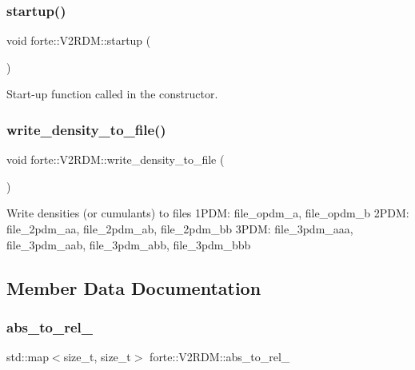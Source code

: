 \subsubsection{\texorpdfstring{startup()}{startup()}}
{\footnotesize\ttfamily void forte\+::\+V2\+R\+D\+M\+::startup (\begin{DoxyParamCaption}{ }\end{DoxyParamCaption})\hspace{0.3cm}{\ttfamily [protected]}}



Start-\/up function called in the constructor. 

\mbox{\label{classforte_1_1_v2_r_d_m_a76e38b06a06e5f49b8fcc042f86c26d1}} 
\subsubsection{\texorpdfstring{write\+\_\+density\+\_\+to\+\_\+file()}{write\_density\_to\_file()}}
{\footnotesize\ttfamily void forte\+::\+V2\+R\+D\+M\+::write\+\_\+density\+\_\+to\+\_\+file (\begin{DoxyParamCaption}{ }\end{DoxyParamCaption})\hspace{0.3cm}{\ttfamily [protected]}}

Write densities (or cumulants) to files 1\+P\+DM\+: file\+\_\+opdm\+\_\+a, file\+\_\+opdm\+\_\+b 2\+P\+DM\+: file\+\_\+2pdm\+\_\+aa, file\+\_\+2pdm\+\_\+ab, file\+\_\+2pdm\+\_\+bb 3\+P\+DM\+: file\+\_\+3pdm\+\_\+aaa, file\+\_\+3pdm\+\_\+aab, file\+\_\+3pdm\+\_\+abb, file\+\_\+3pdm\+\_\+bbb 

\subsection{Member Data Documentation}
\mbox{\label{classforte_1_1_v2_r_d_m_a7c12267657e6f4736b8b4f74f90b6d59}} 
\subsubsection{\texorpdfstring{abs\+\_\+to\+\_\+rel\+\_\+}{abs\_to\_rel\_}}
{\footnotesize\ttfamily std\+::map$<$size\+\_\+t, size\+\_\+t$>$ forte\+::\+V2\+R\+D\+M\+::abs\+\_\+to\+\_\+rel\+\_\+\hspace{0.3cm}{\ttfamily [protected]}}



